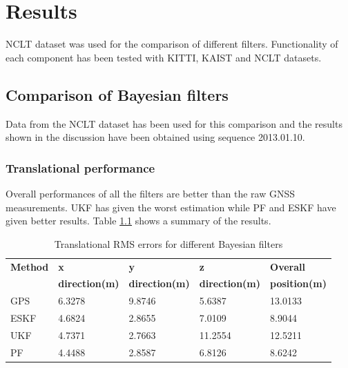 \chapter{Results}
\label{chapter:results}
\gls{NCLT} dataset was used for the comparison of different filters. Functionality of each component has been tested with \gls{KITTI}, \gls{KAIST} and \gls{NCLT} datasets.




\section{Comparison of Bayesian filters}
Data from the \gls{NCLT} dataset has been used for this comparison and the results shown in the discussion have been obtained using sequence 2013.01.10.
\subsection{Translational performance}
Overall performances of all the filters are better than the raw \gls{GNSS} measurements. \gls{UKF} has given the worst estimation while \gls{PF} and \gls{ESKF} have given better results. Table \ref{table:ch:RMSErrorPosition} shows a summary of the results.
\begin{table}[h]
    \centering
    \begin{tabular}{|p{2.5cm}|p{2.5cm}|p{2.5cm}|p{2.5cm}|p{2.5cm}|} 
        \hline
            
        \textbf{Method} & \textbf{x} & \textbf{y} & \textbf{z}& \textbf{Overall} \\
        \textbf{} & \textbf{direction(m)} & \textbf{direction(m)} & \textbf{direction(m)}& \textbf{position(m)} \\
        \hline
        GPS&6.3278 &9.8746 &5.6387& 13.0133\\
        \hline
        ESKF &4.6824& 2.8655 &7.0109 &8.9044\\
        \hline
        UKF &4.7371& 2.7663 &11.2554 &12.5211
        \\
        \hline
        PF& 4.4488& 2.8587& 6.8126& 8.6242
        \\
        \hline
    \end{tabular}
\caption{Translational \gls{RMS} errors for different Bayesian filters}
\label{table:ch:RMSErrorPosition}
\end{table}

